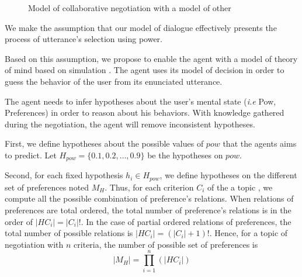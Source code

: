 \documentclass[sigconf]{aamas}  %
\begin{document}
	\begin{figure}
			\caption{Model of collaborative negotiation with a model of other} 
			\label{fig:model}
	\end{figure} 
	
	We make the assumption that our model of dialogue effectively presents the process of utterance's selection using power. 
	
	Based on this assumption, we propose to enable the agent with a model of theory of mind based on simulation \cite{bibid}. The agent uses its model of decision in order to guess the behavior of the user from its enunciated utterance.   
	
	The agent needs to infer hypotheses about the user's mental state (\emph{i.e} Pow, Preferences) in order to reason about his behaviors. With knowledge gathered during the negotiation, the agent will remove inconsistent hypotheses.
	
	First, we define hypotheses about the possible values of $pow$ that the agents aims to predict. Let $H_{pow} = \{0.1, 0.2, \ldots, 0.9\}$ be the hypotheses on $pow$.
	
	Second, for each fixed hypothesis $ h_i \in H_{pow}$, we define hypotheses on the different set of preferences  noted $M_H $. Thus, for each criterion $C_i$ of the a topic , we compute all the possible combination of preference's relations. When relations of preferences are total ordered, the total number of preference's relations is in the order of $|H{C_i}| = |C_i|!$. In the case of partial ordered relations of preferences, the total number of possible relations is  $ |H{C_i}| = (|C_i| + 1)!$. Hence, for a topic of negotiation with $n$ criteria, the number of possible set of preferences is 
	$$ |M_H| = \prod_{i=1}^n (|H{C_i}|)$$ 
	
\end{document}
